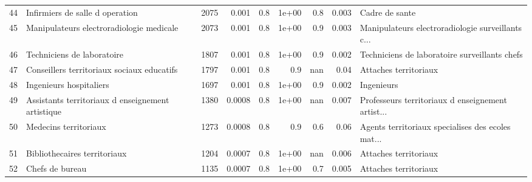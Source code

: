 \documentclass[11pt,a4paper]{article}
\begin{document}
\begin{tabular}{llrrrrrrl}
	44  &                    Infirmiers de salle d operation &           2075 &          0.001 &                    0.8 &              1e+00 &                               0.8 &                                    0.003 &                                     Cadre de sante \\
	45  &           Manipulateurs electroradiologie medicale &           2073 &          0.001 &                    0.8 &              1e+00 &                               0.9 &                                    0.003 &  Manipulateurs electroradiologie surveillants c... \\
	46  &                         Techniciens de laboratoire &           1807 &          0.001 &                    0.8 &              1e+00 &                               0.9 &                                    0.002 &      Techniciens de laboratoire surveillants chefs \\
	47  &         Conseillers territoriaux sociaux educatifs &           1797 &          0.001 &                    0.8 &                0.9 &                               nan &                                     0.04 &                              Attaches territoriaux \\
	48  &                            Ingenieurs hospitaliers &           1697 &          0.001 &                    0.8 &              1e+00 &                               0.9 &                                    0.002 &                                         Ingenieurs \\
	49  &  Assistants territoriaux d enseignement artistique &           1380 &         0.0008 &                    0.8 &              1e+00 &                               nan &                                    0.007 &  Professeurs territoriaux d enseignement artist... \\
	50  &                              Medecins territoriaux &           1273 &         0.0008 &                    0.8 &                0.9 &                               0.6 &                                     0.06 &  Agents territoriaux specialises des ecoles mat... \\
	51  &                       Bibliothecaires territoriaux &           1204 &         0.0007 &                    0.8 &              1e+00 &                               nan &                                    0.006 &                              Attaches territoriaux \\
	52  &                                    Chefs de bureau &           1135 &         0.0007 &                    0.8 &              1e+00 &                               0.7 &                                    0.005 &                              Attaches territoriaux \\

\end{tabular}
\end{document}
